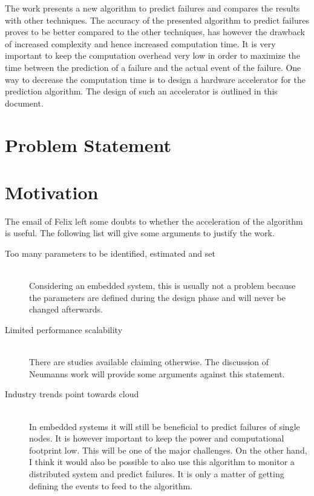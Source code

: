 \documentclass[mscthesis]{usiinfthesis}
\begin{document}
The work presents a new algorithm to predict failures and compares the results
with other techniques. The accuracy of the presented algorithm to predict
failures proves to be better compared to the other techniques, has however the
drawback of increased complexity and hence increased computation time. It is
very important to keep the computation overhead very low in order to maximize
the time between the prediction of a failure and the actual event of the
failure. One way to decrease the computation time is to design a hardware
accelerator for the prediction algorithm. The design of such an accelerator is
outlined in this document.

\section{Problem Statement}
\label{ch:_intro_prob}
\section{Motivation}
\label{ch:intro_mot}
The email of Felix left some doubts to whether the acceleration of the
algorithm is useful. The following list will give some arguments to justify
the work.
\begin{description}
    \item[Too many parameters to be identified, estimated and set] \hfill \\
        Considering an embedded system, this is usually not a problem because
        the parameters are defined during the design phase and will never be
        changed afterwards.
    \item[Limited performance scalability] \hfill \\
        There are studies available claiming otherwise. The discussion of
        Neumanns work will provide some arguments against this statement.
    \item[Industry trends point towards cloud] \hfill \\
        In embedded systems it will still be beneficial to predict failures of
        single nodes. It is however important to keep the power and
        computational footprint low. This will be one of the major challenges.
        On the other hand, I think it would also be possible to also use this
        algorithm to monitor a distributed system and predict failures. It is
        only a matter of getting defining the events to feed to the algorithm.
\end{description}
\end{document}

